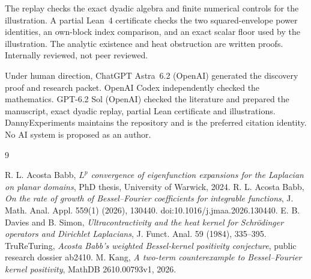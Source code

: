 \documentclass[11pt]{amsart}
\begin{document}
The replay checks the exact dyadic algebra and finite numerical
controls for the illustration. A partial Lean~4 certificate
checks the two squared-envelope power identities, an own-block
index comparison, and an exact scalar floor used by the
illustration. The analytic existence and heat obstruction
are written proofs. Internally reviewed, not peer reviewed.

Under human direction, ChatGPT Astra~6.2 (OpenAI) generated the
discovery proof and research packet. OpenAI Codex independently
checked the mathematics. GPT-6.2 Sol (OpenAI) checked the
literature and prepared the manuscript, exact dyadic replay,
partial Lean certificate and illustrations. DannyExperiments
maintains the repository and is the preferred citation identity.
No AI system is proposed as an author.

\begin{thebibliography}{9}
\raggedright
{} R. L. Acosta Babb, \emph{\(L^p\) convergence of
eigenfunction expansions for the Laplacian on planar domains},
PhD thesis, University of Warwick, 2024.
 R. L. Acosta Babb,
\emph{On the rate of growth of Bessel--Fourier coefficients for integrable
functions}, J. Math. Anal. Appl. 559(1) (2026), 130440.
doi:10.1016/j.jmaa.2026.130440.
 E. B. Davies and B. Simon,
\emph{Ultracontractivity and the heat kernel for Schr\"odinger operators and
Dirichlet Laplacians}, J. Funct. Anal. 59 (1984), 335--395.
 TruReTuring, \emph{Acosta Babb's weighted Bessel-kernel
positivity conjecture}, public research dossier ab2410.
 M. Kang, \emph{A two-term counterexample to Bessel--Fourier
kernel positivity}, MathDB 2610.00793v1, 2026.
\end{thebibliography}
\end{document}
